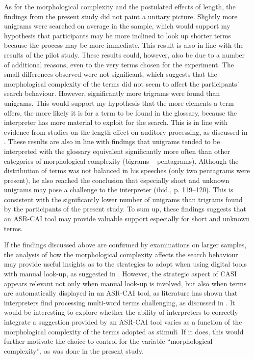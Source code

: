 As for the morphological complexity and the postulated effects of length, the findings from the present study did not paint a unitary picture. Slightly more unigrams were searched on average in the sample, which would support my hypothesis that participants may be more inclined to look up shorter terms because the process may be more immediate. This result is also in line with the results of the pilot study. These results could, however, also be due to a number of additional reasons, even to the very terms chosen for the experiment. The small differences observed were not significant, which suggests that the morphological complexity of the terms did not seem to affect the participants' search behaviour. However, significantly more trigrams were found than unigrams. This would support my hypothesis that the more elements a term offers, the more likely it is for a term to be found in the glossary, because the interpreter has more material to exploit for the search. This is in line with evidence from studies on the length effect on auditory processing, as discussed in . These results are also in line with  findings that unigrams tended to be interpreted with the glossary equivalent significantly more often than other categories of morphological complexity (bigrams – pentagrams). Although the distribution of terms was not balanced in his speeches (only two pentagrams were present), he also reached the conclusion that especially short and unknown unigrams may pose a challenge to the interpreter (ibid., p. 119--120). This is consistent with the significantly lower number of unigrams than trigrams found by the participants of the present study. To sum up, these findings suggests that an ASR-CAI tool may provide valuable support especially for short and unknown terms.

If the findings discussed above are confirmed by examinations on larger samples, the analysis of how the morphological complexity affects the search behaviour may provide useful insights as to the strategies to adopt when using digital tools with manual look-up, as suggested in \citet{prandi_exploratory_2018}. However, the strategic aspect of CASI appears relevant not only when manual look-up is involved, but also when terms are automatically displayed in an ASR-CAI tool, as literature has shown that interpreters find processing multi-word terms challenging, as discussed in . It would be interesting to explore whether the ability of interpreters to correctly integrate a suggestion provided by an ASR-CAI tool varies as a function of the morphological complexity of the terms adopted as stimuli. If it does, this would further motivate the choice to control for the variable ``morphological complexity'', as was done in the present study.

